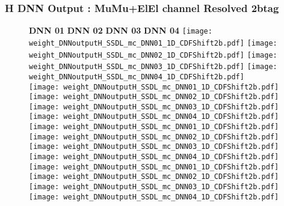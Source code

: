 \documentclass[9pt]{beamer}
\begin{document}
\begin{frame}
	\frametitle{H DNN Output : MuMu+ElEl channel Resolved 2btag}
	\begin{figure}
	    \textbf{DNN 01} \hspace{1.2cm} \textbf{DNN 02} \hspace{1.2cm} \textbf{DNN 03} \hspace{1.2cm} \textbf{DNN 04}
        \centering
		\texttt{[image: weight\_DNNoutputH\_SSDL\_mc\_DNN01\_1D\_CDFShift2b.pdf]}
		\texttt{[image: weight\_DNNoutputH\_SSDL\_mc\_DNN02\_1D\_CDFShift2b.pdf]}
		\texttt{[image: weight\_DNNoutputH\_SSDL\_mc\_DNN03\_1D\_CDFShift2b.pdf]}
		\texttt{[image: weight\_DNNoutputH\_SSDL\_mc\_DNN04\_1D\_CDFShift2b.pdf]}\\
		\texttt{[image: weight\_DNNoutputH\_SSDL\_mc\_DNN01\_1D\_CDFShift2b.pdf]}
		\texttt{[image: weight\_DNNoutputH\_SSDL\_mc\_DNN02\_1D\_CDFShift2b.pdf]}
		\texttt{[image: weight\_DNNoutputH\_SSDL\_mc\_DNN03\_1D\_CDFShift2b.pdf]}
		\texttt{[image: weight\_DNNoutputH\_SSDL\_mc\_DNN04\_1D\_CDFShift2b.pdf]}\\
		\texttt{[image: weight\_DNNoutputH\_SSDL\_mc\_DNN01\_1D\_CDFShift2b.pdf]}
		\texttt{[image: weight\_DNNoutputH\_SSDL\_mc\_DNN02\_1D\_CDFShift2b.pdf]}
		\texttt{[image: weight\_DNNoutputH\_SSDL\_mc\_DNN03\_1D\_CDFShift2b.pdf]}
		\texttt{[image: weight\_DNNoutputH\_SSDL\_mc\_DNN04\_1D\_CDFShift2b.pdf]}\\
		\texttt{[image: weight\_DNNoutputH\_SSDL\_mc\_DNN01\_1D\_CDFShift2b.pdf]}
		\texttt{[image: weight\_DNNoutputH\_SSDL\_mc\_DNN02\_1D\_CDFShift2b.pdf]}
		\texttt{[image: weight\_DNNoutputH\_SSDL\_mc\_DNN03\_1D\_CDFShift2b.pdf]}
		\texttt{[image: weight\_DNNoutputH\_SSDL\_mc\_DNN04\_1D\_CDFShift2b.pdf]}\\
	\end{figure}
\end{frame}
\end{document}
